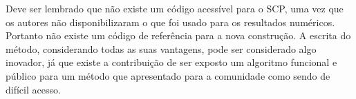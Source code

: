 Deve ser lembrado que não existe um código acessível para o SCP, uma vez que os
autores não disponibilizaram o que foi usado para os resultados numéricos. Portanto
não existe um código de referência para a nova construção. A escrita do método,
considerando todas as suas vantagens, pode ser considerado algo inovador, já que
existe a contribuição de ser exposto um algoritmo funcional e público para um
método que apresentado para a comunidade como sendo de difícil acesso.





